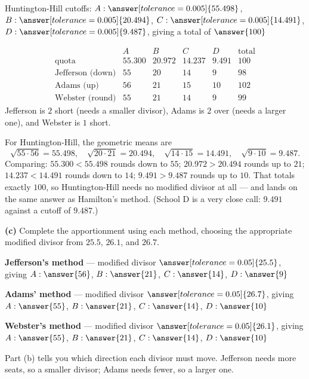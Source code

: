 \documentclass[12pt]{ximera}
\begin{document}
\begin{problem}
\begin{prompt}
\smallskip
Huntington-Hill cutoffs: $A: \answer[tolerance=0.005]{55.498}$,
$B: \answer[tolerance=0.005]{20.494}$, $C: \answer[tolerance=0.005]{14.491}$,
$D: \answer[tolerance=0.005]{9.487}$, giving a total of $\answer{100}$

\begin{feedback}
\[
\begin{array}{lccccl}
 & A & B & C & D & \text{total}\\
\text{quota} & 55.300 & 20.972 & 14.237 & 9.491 & 100\\
\text{Jefferson (down)} & 55 & 20 & 14 & 9 & 98\\
\text{Adams (up)} & 56 & 21 & 15 & 10 & 102\\
\text{Webster (round)} & 55 & 21 & 14 & 9 & 99
\end{array}
\]
Jefferson is $2$ short (needs a smaller divisor), Adams is $2$ over (needs a larger
one), and Webster is $1$ short.

For Huntington-Hill, the geometric means are
\[
\sqrt{55\cdot 56}=55.498, \quad \sqrt{20\cdot 21}=20.494, \quad
\sqrt{14\cdot 15}=14.491, \quad \sqrt{9\cdot 10}=9.487.
\]
Comparing: $55.300 < 55.498$ rounds down to $55$; $20.972 > 20.494$ rounds up to $21$;
$14.237 < 14.491$ rounds down to $14$; $9.491 > 9.487$ rounds up to $10$. That totals
exactly $100$, so Huntington-Hill needs no modified divisor at all --- and lands on the
same answer as Hamilton's method. (School D is a very close call: $9.491$ against a
cutoff of $9.487$.)
\end{feedback}
\end{prompt}

\begin{prompt}
\textbf{(c)} Complete the apportionment using each method, choosing the appropriate
modified divisor from $25.5$, $26.1$, and $26.7$.

\textbf{Jefferson's method} --- modified divisor $\answer[tolerance=0.05]{25.5}$, giving
$A: \answer{56}$, $B: \answer{21}$, $C: \answer{14}$, $D: \answer{9}$

\smallskip
\textbf{Adams' method} --- modified divisor $\answer[tolerance=0.05]{26.7}$, giving
$A: \answer{55}$, $B: \answer{21}$, $C: \answer{14}$, $D: \answer{10}$

\smallskip
\textbf{Webster's method} --- modified divisor $\answer[tolerance=0.05]{26.1}$, giving
$A: \answer{55}$, $B: \answer{21}$, $C: \answer{14}$, $D: \answer{10}$

\begin{hint}
Part (b) tells you which direction each divisor must move. Jefferson needs more seats,
so a smaller divisor; Adams needs fewer, so a larger one.
\end{hint}


\end{prompt}
\end{problem}
\end{document}
